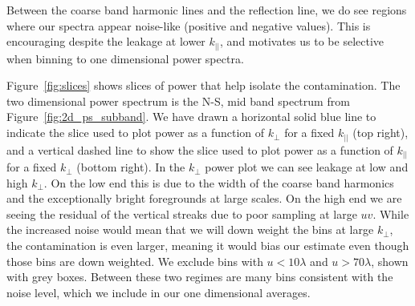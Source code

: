 \documentclass[iop]{emulateapj}
\begin{document}
Between the coarse band harmonic lines and the reflection line, we do see regions where 
our spectra appear noise-like (positive and negative values). This is encouraging despite 
the leakage at lower $k_{||}$, and motivates us to be selective when binning to one 
dimensional power spectra.

Figure~\ref{fig:slices} shows slices of power that help isolate the contamination. The two 
dimensional power spectrum is the N-S, mid band spectrum from 
Figure~\ref{fig:2d_ps_subband}. We have drawn a horizontal solid blue line to indicate the 
slice used to plot power as a function of $k_{\perp}$ for a fixed $k_{||}$ (top right), and a 
vertical dashed line to show the slice used to plot power as a function of $k_{||}$ for a fixed 
$k_{\perp}$ (bottom right). In the $k_{\perp}$ power plot we can see leakage at low and high
$k_{\perp}$. On the low end this is due to the width of the coarse band harmonics and the
exceptionally bright foregrounds at large scales. On the high end we are seeing the residual
of the vertical streaks due to poor sampling at large $uv$. While the increased noise would
mean that we will down weight the bins at large $k_{\perp}$, the contamination is even
larger, meaning it would bias our estimate even though those bins are down weighted. 
We exclude bins with $u<10\lambda$ and $u>70\lambda$, shown with grey boxes.
Between these two regimes are many bins consistent with the noise level, which we include
in our one dimensional averages.
\end{document}
